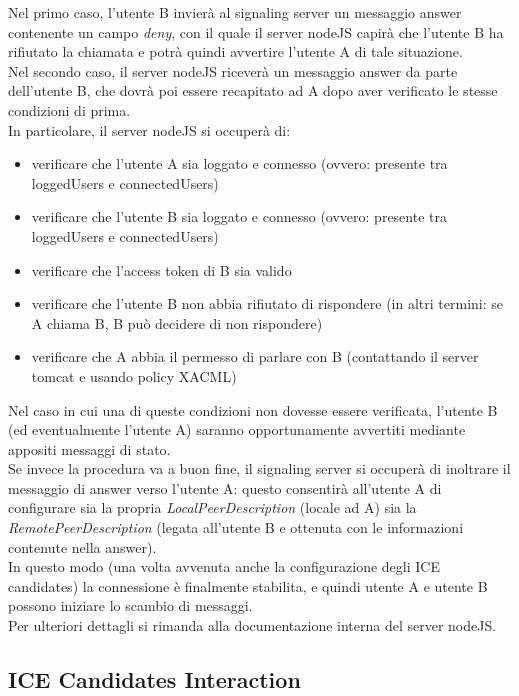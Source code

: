 Nel primo caso, l'utente B invierà al signaling server un messaggio answer contenente un campo \textit{deny}, con il quale il server nodeJS capirà che l'utente B ha rifiutato la chiamata e potrà quindi avvertire l'utente A di tale situazione.\\
Nel secondo caso, il server nodeJS riceverà un messaggio answer da parte dell'utente B, che dovrà poi essere recapitato ad A dopo aver verificato le stesse condizioni di prima.\\
In particolare, il server nodeJS si occuperà di:
\begin{itemize}
\item verificare che l'utente A sia loggato e connesso (ovvero: presente tra loggedUsers e connectedUsers)
\item verificare che l'utente B sia loggato e connesso (ovvero: presente tra loggedUsers e connectedUsers)
\item verificare che l'access token di B sia valido
\item verificare che l'utente B non abbia rifiutato di rispondere (in altri termini: se A chiama B, B può decidere di non rispondere)
\item verificare che A abbia il permesso di parlare con B (contattando il server tomcat e usando policy XACML)
\end{itemize}

Nel caso in cui una di queste condizioni non dovesse essere verificata, l'utente B (ed eventualmente l'utente A) saranno opportunamente avvertiti mediante appositi messaggi di stato.\\
Se invece la procedura va a buon fine, il signaling server si occuperà di inoltrare il messaggio di answer verso l'utente A: questo consentirà all'utente A di configurare sia la propria \textit{LocalPeerDescription} (locale ad A) sia la \textit{RemotePeerDescription} (legata all'utente B e ottenuta con le informazioni contenute nella answer).\\
In questo modo (una volta avvenuta anche la configurazione degli ICE candidates) la connessione è finalmente stabilita, e quindi utente A e utente B possono iniziare lo scambio di messaggi.\\
Per ulteriori dettagli si rimanda alla documentazione interna del server nodeJS.\\

\subsection{ICE Candidates Interaction}

